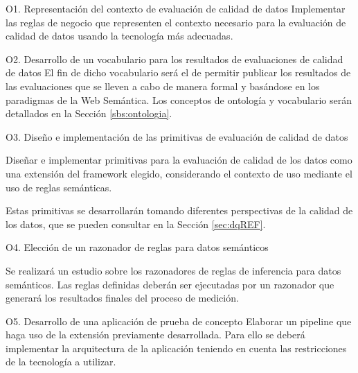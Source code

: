 \begin{definitionlist}
\item[O1. Representación del contexto de evaluación de calidad de datos]
Implementar  las  reglas  de  negocio  que representen el contexto necesario
para la evaluación de
calidad  de datos usando la tecnología más adecuadas.
\label{sec:reglas}

\item[O2. Desarrollo de un vocabulario para los resultados
  de evaluaciones de calidad de datos]
El fin de dicho vocabulario será el de permitir publicar los
resultados de las evaluaciones que se lleven a cabo de manera formal y basándose
en los paradigmas de la Web Semántica. Los conceptos de ontología y vocabulario
serán detallados en la Sección \ref{sbs:ontologia}. 

\item[O3. Diseño e implementación de las primitivas de evaluación de calidad de datos]

Diseñar e implementar primitivas para la evaluación de calidad de los datos como una
extensión del framework elegido, considerando el contexto de uso mediante el uso
de reglas semánticas.

Estas primitivas se desarrollarán tomando diferentes perspectivas de la calidad
de los datos, que se pueden consultar en la Sección \ref{sec:dqREF}. 


\item[O4. Elección de un razonador de reglas para datos semánticos]

Se realizará un estudio sobre los razonadores de reglas de inferencia para
datos semánticos. Las reglas definidas deberán ser
ejecutadas por un razonador que generará los resultados finales del proceso de
medición. 


\item[O5. Desarrollo de una aplicación de prueba de concepto]
Elaborar un pipeline que haga uso de la extensión
previamente desarrollada. Para ello se deberá implementar la arquitectura de
la aplicación teniendo en cuenta las restricciones de la tecnología a utilizar.

\end{definitionlist}
